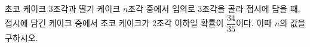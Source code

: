 초코 케이크 $3$조각과 딸기 케이크 $n$조각 중에서 임의로 $3$조각을 골라 접시에 담을 때, 접시에 담긴 케이크 중에서 초코 케이크가 $2$조각 이하일 확률이 $\dfrac{34}{35}$이다. 이때 $n$의 값을 구하시오.
